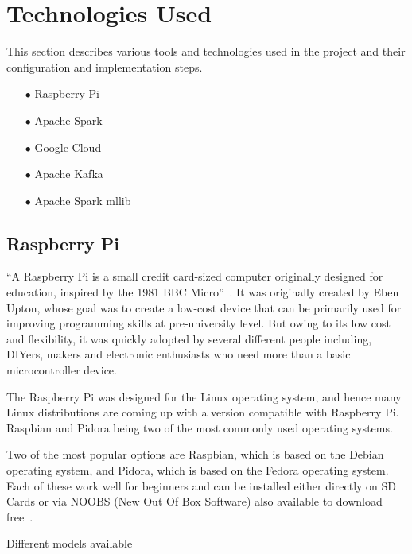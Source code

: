 \section{Technologies Used}

This section describes various tools and technologies used in the
project and their configuration and implementation steps.

\begin{itemize}
	\item[$\bullet$] Raspberry Pi 
	\item[$\bullet$] Apache Spark 
	\item[$\bullet$] Google Cloud
	\item[$\bullet$] Apache Kafka	
	\item[$\bullet$] Apache Spark mllib	
\end{itemize}

\subsection{Raspberry Pi}

``A Raspberry Pi is a small credit card-sized computer originally
designed for education, inspired by the 1981 BBC
Micro''~\cite{hid-sp18-510-rpi}. It was originally created by Eben
Upton, whose goal was to create a low-cost device that can be
primarily used for improving programming skills at pre-university
level. But owing to its low cost and flexibility, it was quickly
adopted by several different people including, DIYers, makers and
electronic enthusiasts who need more than a basic microcontroller
device\cite{hid-sp18-510-rpi}.

The Raspberry Pi was designed for the Linux operating system, and
hence many Linux distributions are coming up with a version compatible
with Raspberry Pi. Raspbian and Pidora being two of the most commonly
used operating systems.

Two of the most popular options are Raspbian, which is based on the
Debian operating system, and Pidora, which is based on the Fedora
operating system. Each of these work well for beginners and can be
installed either directly on SD Cards or via NOOBS (New Out Of Box
Software) also available to download free~\cite{hid-sp18-510-rpi}.

Different models available

